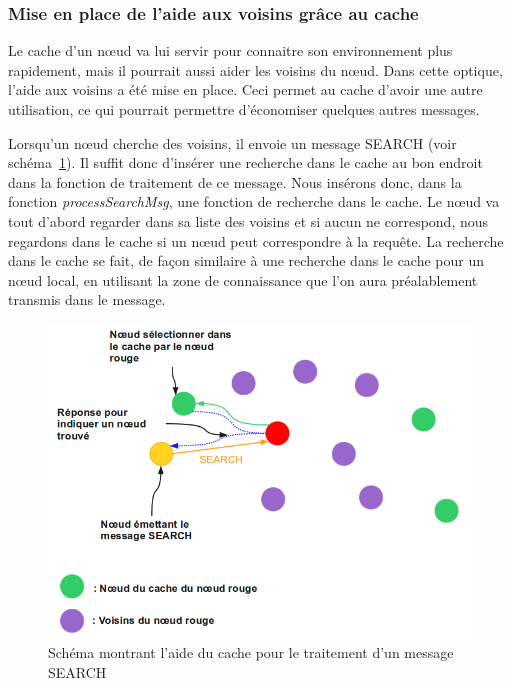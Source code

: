 \subsubsection{Mise en place de l'aide aux voisins grâce au cache}

Le cache d'un nœud va lui servir pour connaitre son environnement plus rapidement, mais il pourrait aussi aider les voisins du nœud. Dans cette optique, l'aide aux voisins a été mise en place. Ceci permet au cache d'avoir une autre utilisation, ce qui pourrait permettre d'économiser quelques autres messages. 
\par Lorsqu'un nœud cherche des voisins, il envoie un message SEARCH (voir schéma~\ref{schemaHelpCache}). Il suffit donc d'insérer une recherche dans le cache au bon endroit dans la fonction de traitement de ce message. Nous insérons donc, dans la fonction \textit{processSearchMsg}, une fonction de recherche dans le cache. Le nœud va tout d'abord regarder dans sa liste des voisins et si aucun ne correspond, nous regardons dans le cache si un nœud peut correspondre à la requête. La recherche dans le cache se fait, de façon similaire à une recherche dans le cache pour un nœud local, en utilisant la zone de connaissance que l'on aura préalablement transmis dans le message.

	\begin{figure}[!h]
        \centering
        \includegraphics[scale=0.4]{./Ressources/Images/cacheHelp.png}
        \caption{Schéma montrant l'aide du cache pour le traitement d'un message SEARCH}
        \label{schemaHelpCache}
        \end{figure}

